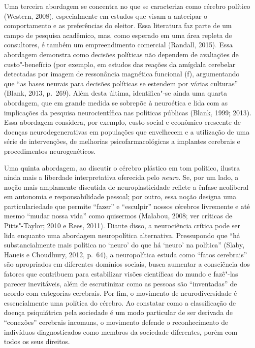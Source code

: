 Uma terceira abordagem se concentra no que se caracteriza como cérebro
político (Western, 2008), especialmente em estudos que visam a antecipar o
comportamento e as preferências do eleitor. Essa literatura faz parte de
um campo de pesquisa acadêmico, mas, como esperado em uma área repleta
de consultores, é também um empreendimento comercial (Randall, 2015).
Essa abordagem demonstra como decisões políticas não
dependem de avaliações de custo"-benefício (por exemplo, em estudos das
reações da amígdala cerebelar detectadas por imagem de ressonância
magnética funcional (f), argumentando que ``as bases neurais para
decisões políticas se estendem por várias culturas'' (Blank, 2013,
p.~269). Além desta última, identifica"-se ainda uma quarta abordagem, que
em grande medida se sobrepõe à neuroética e lida com as implicações da
pesquisa neurocientífica nas políticas públicas (Blank, 1999; 2013).
Essa abordagem considera, por exemplo, custo social e econômico crescente de
doenças neurodegenerativas em populações que envelhecem e a utilização
de uma série de intervenções, de melhorias psicofarmacológicas a
implantes cerebrais e procedimentos neurogenéticos.

Uma quinta abordagem, ao discutir o cérebro plástico em tom político,
ilustra ainda mais a liberdade interpretativa oferecida pelo
\emph{neuro}. Se, por um lado, a noção mais amplamente discutida de
neuroplasticidade reflete a ênfase neoliberal em autonomia e
responsabilidade pessoal; por outro, essa noção designa uma
particulariedade que permite ``fazer'' e ``esculpir'' nossos cérebros
livremente e até mesmo ``mudar nossa vida'' como quisermos (Malabou,
2008; ver críticas de Pitts"-Taylor; 2010 e Rees, 2011). Diante disso, a
neurociência crítica pode ser lida enquanto uma abordagem neuropolítica
alternativa. Pressupondo que ``há substancialmente mais política no
`neuro' do que há `neuro' na política'' (Slaby, Haueis e Choudhury, 2012,
p.~64), a neuropolítica estuda como ``fatos cerebrais'' são apropriados
em diferentes domínios sociais, busca aumentar a consciência dos fatores
que contribuem para estabilizar visões científicas do mundo e fazê"-las
parecer inevitáveis, além de escrutinizar como as pessoas são
``inventadas'' de acordo com categorias cerebrais. Por fim, o
movimento de neurodiversidade é essencialmente uma política do cérebro.
Ao constatar como a classificação de doença psiquiátrica pela sociedade
é um modo particular de ser derivada de ``conexões'' cerebrais incomuns,
o movimento defende o reconhecimento de indivíduos diagnosticados como
membros da sociedade diferentes, porém com todos os seus direitos.

